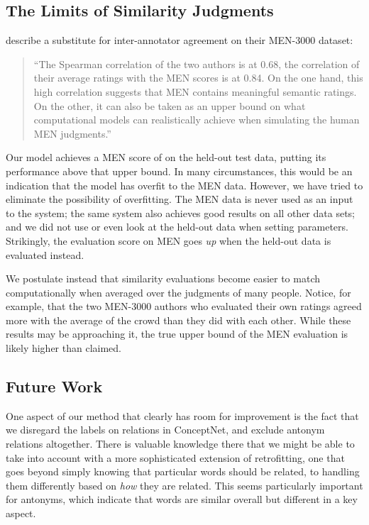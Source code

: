 \documentclass[11pt,letterpaper]{article}
\begin{document}

\subsection{The Limits of Similarity Judgments}

 describe a substitute for inter-annotator agreement on
their MEN-3000 dataset:

\begin{quote}
``The Spearman correlation of the two authors is at 0.68, the correlation of their
average ratings with the MEN scores is at 0.84. On the one hand, this high
correlation suggests that MEN contains meaningful semantic ratings. On the
other, it can also be taken as an upper bound on what computational models can
realistically achieve when simulating the human MEN judgments.''
\end{quote}

Our model achieves a MEN score of \scoreMEN{} on the
held-out test data, putting its performance above that upper bound. In many
circumstances, this would be an indication that the model has overfit to the
MEN data. However, we have tried to eliminate the possibility of overfitting.
The MEN data is never used as an input to the system; the same system also
achieves good results on all other data sets; and we did not use or even
look at the held-out data when setting parameters. Strikingly, the evaluation
score on MEN goes {\em up} when the held-out data is evaluated instead.

We postulate instead that similarity evaluations become easier to match
computationally when averaged over the judgments of many people. Notice, for
example, that the two MEN-3000 authors who evaluated their own ratings
agreed more with the average of the crowd than they did with each other.
While these results may be approaching it, the true upper bound of the MEN
evaluation is likely higher than claimed.

\subsection{Future Work}

One aspect of our method that clearly has room for improvement is the fact that
we disregard the labels on relations in ConceptNet, and exclude antonym
relations altogether. There is valuable knowledge there that we might be able
to take into account with a more sophisticated extension of retrofitting, one
that goes beyond simply knowing that particular words should be related, to
handling them differently based on {\em how} they are related. This seems
particularly important for antonyms, which indicate that words are similar
overall but different in a key aspect.
\end{document}
